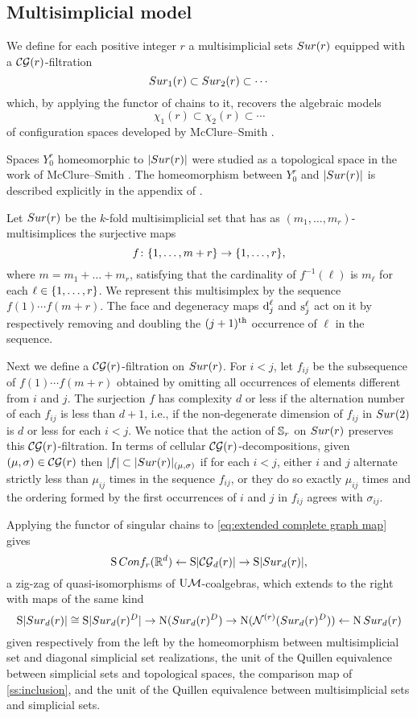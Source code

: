 
\subsection{Multisimplicial model}\label{ss:surjection model}

We define for each positive integer $r$ a multisimplicial sets $Sur(r)$ equipped with a $\mathcal{CG}(r)$-filtration
\[
Sur_{1}(r) \subset Sur_{2}(r) \subset \dotsb
\]
which, by applying the functor of chains to it, recovers the algebraic models
\[
\chi_1(r) \subset \chi_2(r) \subset \dotsb
\]
of configuration spaces developed by McClure--Smith \cite{mcluresmith2004geomodel}.

Spaces $Y_0^r$ homeomorphic to $\lvert Sur(r)\rvert$ were studied as a topological space in the work of McClure--Smith \cite{mcclure2003multivariable}.
The homeomorphism between $Y_0^r$ and $\lvert Sur(r)\rvert$ is described explicitly in the appendix of \cite{salvatore2009deligne}.

Let $Sur(r)$ be the $k$-fold multisimplicial set that has as $(m_1,\dots,m_r)$-multisimplices the surjective maps
\[
f \colon \{1,\dots,m+r\} \to \{1,\dots,r\},
\]
where $m = m_1+\dots+m_r$, satisfying that the cardinality of $f^{-1}(\ell)$ is $m_\ell$ for each $\ell \in \{1,\dots,r\}$.
We represent this multisimplex by the sequence $f(1) \dotsm f(m+r)$.
The face and degeneracy maps $\operatorname{d}^\ell_j$ and $\operatorname{s}^\ell_j$ act on it by respectively removing and doubling the $(j+1)^{\mathrm{th}}$ occurrence of $\ell$ in the sequence.

Next we define a $\mathcal{CG}(r)$-filtration on $Sur(r)$.
For $i<j$, let $f_{ij}$ be the subsequence of $f(1) \dotsm f(m+r)$ obtained by omitting all occurrences of elements different from $i$ and $j$.
The surjection $f$ has complexity $d$ or less if the alternation number of each $f_{ij}$ is less than $d+1$, i.e., if the non-degenerate dimension of $f_{ij}$ in $Sur(2)$ is $d$ or less for each $i<j$.
We notice that the action of $\mathbb{S}_r$ on $Sur(r)$ preserves this $\mathcal{CG}(r)$-filtration.
In terms of cellular $\mathcal{CG}(r)$-decompositions, given $(\mu,\sigma) \in \mathcal{CG}(r)$ then $\lvert f\rvert \subset \lvert Sur(r)\rvert_{(\mu,\sigma)}$ if for each $i<j$, either $i$ and $j$ alternate strictly less than $\mu_{ij}$ times in the sequence $f_{ij}$, or they do so exactly $\mu_{ij}$ times and the ordering formed by the first occurrences of $i$ and $j$ in $f_{ij}$ agrees with $\sigma_{ij}$.

Applying the functor of singular chains to \cref{eq:extended complete graph map} gives
\[
\operatorname{S}Conf_{r}(\mathbb{R}^{d}) \leftarrow
\operatorname{S}\lvert\mathcal{CG}_{d}(r)\rvert \to
\operatorname{S}\lvert Sur_{d}(r)\rvert,
\]
a zig-zag of quasi-isomorphisms of $\mathrm{U}\mathcal{M}$-coalgebras, which extends to the right with maps of the same kind
\[
\operatorname{S}\lvert Sur_{d}(r)\rvert \cong
\operatorname{S} \lvert Sur_{d}(r)^{D}\rvert \to
\operatorname{N}(Sur_{d}(r)^D) \to
\operatorname{N}(\mathcal{N}^{(r)}(Sur_{d}(r)^D)) \leftarrow
\operatorname{N}Sur_{d}(r)
\]
given respectively from the left by the homeomorphism between multisimplicial set and diagonal simplicial set realizations, the unit of the Quillen equivalence between simplicial sets and topological spaces, the comparison map of \cref{ss:inclusion}, and the unit of the Quillen equivalence between multisimplicial sets and simplicial sets.

